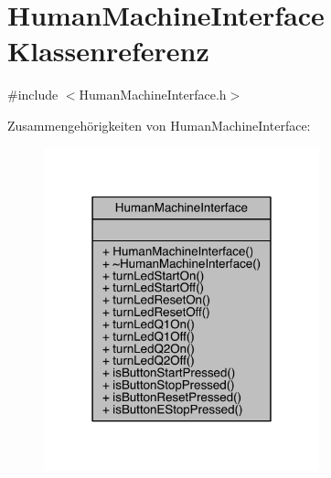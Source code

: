 \hypertarget{class_human_machine_interface}{}\section{Human\+Machine\+Interface Klassenreferenz}
\label{class_human_machine_interface}


{\ttfamily \#include $<$Human\+Machine\+Interface.\+h$>$}



Zusammengehörigkeiten von Human\+Machine\+Interface\+:
\nopagebreak
\begin{figure}[H]
\begin{center}
\leavevmode
\includegraphics[width=226pt]{class_human_machine_interface__coll__graph}
\end{center}
\end{figure}
